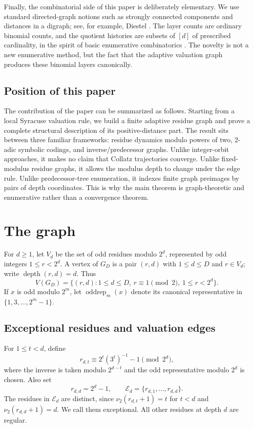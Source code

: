 \documentclass[11pt]{article}
\theoremstyle{definition}
\theoremstyle{remark}
\newcommand{\nuu}{\nu_2}
\newcommand{\Ecal}{\mathcal E}
\newcommand{\depth}{\operatorname{depth}}
\newcommand{\oddrep}{\operatorname{oddrep}}
\begin{document}
Finally, the combinatorial side of this paper is deliberately elementary.  We use standard directed-graph notions such as strongly connected components and distances in a digraph; see, for example, Diestel \cite{DiestelGraphTheory}.  The layer counts are ordinary binomial counts, and the quotient histories are subsets of $[d]$ of prescribed cardinality, in the spirit of basic enumerative combinatorics \cite{StanleyEC1}.  The novelty is not a new enumerative method, but the fact that the adaptive valuation graph produces these binomial layers canonically.

\subsection*{Position of this paper}

The contribution of the paper can be summarized as follows.  Starting from a local Syracuse valuation rule, we build a finite adaptive residue graph and prove a complete structural description of its positive-distance part.  The result sits between three familiar frameworks: residue dynamics modulo powers of two, $2$-adic symbolic codings, and inverse/predecessor graphs.  Unlike integer-orbit approaches, it makes no claim that Collatz trajectories converge.  Unlike fixed-modulus residue graphs, it allows the modulus depth to change under the edge rule.  Unlike predecessor-tree enumeration, it indexes finite graph preimages by pairs of depth coordinates.  This is why the main theorem is graph-theoretic and enumerative rather than a convergence theorem.

\section{The graph}\label{sec:graph}

For $d\ge1$, let $V_d$ be the set of odd residues modulo $2^d$, represented by odd integers $1\le r<2^d$.  A vertex of $G_D$ is a pair $(r,d)$ with $1\le d\le D$ and $r\in V_d$; write $\depth(r,d)=d$.  Thus
\[
V(G_D)=\{(r,d):1\le d\le D,\ r\equiv1\pmod2,\ 1\le r<2^d\}.
\]
If $x$ is odd modulo $2^m$, let $\oddrep_m(x)$ denote its canonical representative in $\{1,3,\ldots,2^m-1\}$.

\subsection{Exceptional residues and valuation edges}

For $1\le t<d$, define
\[
r_{d,t}\equiv 2^t(3^t)^{-1}-1\pmod {2^d},
\]
where the inverse is taken modulo $2^{d-t}$ and the odd representative modulo $2^d$ is chosen.  Also set
\[
r_{d,d}=2^d-1,
\qquad
\Ecal_d=\{r_{d,1},\ldots,r_{d,d}\}.
\]
The residues in $\Ecal_d$ are distinct, since $\nuu(r_{d,t}+1)=t$ for $t<d$ and $\nuu(r_{d,d}+1)=d$.  We call them exceptional.  All other residues at depth $d$ are regular.
\end{document}
